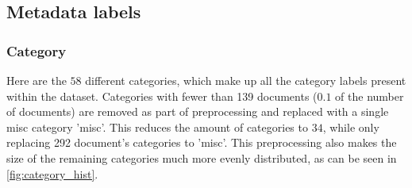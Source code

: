 \subsection{Metadata labels}\label{sec:appendix_meta_data}

\subsubsection{Category}\label{subsec:appendix_category}

Here are the $58$ different categories, which make up all the category labels present within the dataset.
Categories with fewer than 139 documents ($0.1$ of the number of documents) are removed as part of preprocessing and replaced with a single misc category 'misc'.
This reduces the amount of categories to $34$, while only replacing 292 document's categories to 'misc'.
This preprocessing also makes the size of the remaining categories much more evenly distributed, as can be seen in \autoref{fig:category_hist}.


